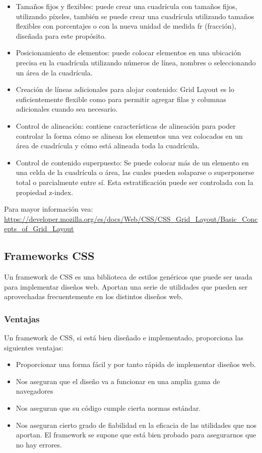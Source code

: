 \begin{enumerate}
\begin{itemize}
	\item Tamaños fijos y flexibles:  puede crear una cuadrícula con tamaños fijos, utilizando píxeles, también se puede crear una cuadrícula utilizando tamaños flexibles con porcentajes o con la nueva unidad de medida fr (fracción), diseñada para este propósito.
	\item Posicionamiento de elementos: puede colocar elementos en una ubicación precisa en la cuadrícula utilizando números de línea, nombres o seleccionando un área de la cuadrícula.
	\item Creación de líneas adicionales para alojar contenido: Grid Layout  es lo suficientemente flexible como para permitir agregar filas y columnas adicionales cuando sea necesario.
	\item Control de alineación: contiene características de alineación para poder controlar la forma cómo se alinean los elementos una vez colocados en un área de cuadrícula y cómo está alineada toda la cuadrícula.
	\item Control de contenido superpuesto: Se puede colocar más de un elemento en una celda de la cuadrícula o área, las cuales pueden solaparse o superponerse total o parcialmente entre sí. Esta estratificación puede ser controlada con la propiedad z-index.
\end{itemize}

\begin{remark}
	Para mayor información vea: 
	\url{https://developer.mozilla.org/es/docs/Web/CSS/CSS_Grid_Layout/Basic_Concepts_of_Grid_Layout}
\end{remark}

\subsection{Frameworks CSS}

\cite{wiki} Un framework de CSS es una biblioteca de estilos genéricos que puede ser usada para implementar diseños web. Aportan una serie de utilidades que pueden ser aprovechadas frecuentemente en los distintos diseños web.

\subsubsection{Ventajas}

Un framework de CSS, si está bien diseñado e implementado, proporciona las siguientes ventajas:

\begin{itemize}
	\item Proporcionar una forma fácil y por tanto rápida de implementar diseños web.
	\item Nos aseguran que el diseño va a funcionar en una amplia gama de navegadores
	\item Nos aseguran que su código cumple cierta normas estándar.
	\item Nos aseguran cierto grado de fiabilidad en la eficacia de las utilidades que nos aportan. El framework se supone que está bien probado para asegurarnos que no hay errores.
\end{itemize}


\end{enumerate}
